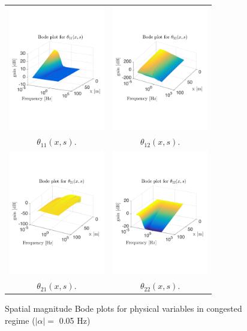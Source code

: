 \documentclass[letterpaper, 10 pt, conference]{ieeeconf}  %
\begin{document}
\begin{figure}
\centering
\begin{tabular}{cc}
\includegraphics[trim = 30mm 60mm 0mm 60mm, width = 4.2cm]{distr_theta_11}
&
\includegraphics[trim = 30mm 60mm 0mm 60mm, width = 4.2cm]{distr_theta_12}
\tabularnewline
$\theta_{11}(x,s)$.
&
$\theta_{12}(x,s)$.
\tabularnewline
\includegraphics[trim = 30mm 60mm 0mm 60mm, width = 4.2cm]{distr_theta_21}
&
\includegraphics[trim = 30mm 60mm 0mm 60mm, width = 4.2cm]{distr_theta_22}
\tabularnewline
$\theta_{21}(x,s)$.
&
$\theta_{22}(x,s)$.
\tabularnewline
\end{tabular}
\caption{Spatial magnitude Bode plots for physical variables in congested regime ($\left|\alpha\right| = $ 0.05 Hz)\label{fig:Magn_spatial_physx_congested}}
\end{figure}
\end{document}
